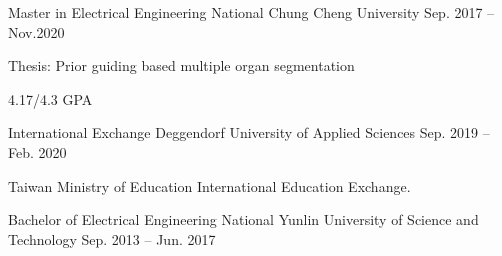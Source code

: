 

\begin{cventries}

\vspace{-0.5cm}
\cventryedu
{Master in Electrical Engineering} %
{National Chung Cheng University} %
{Sep. 2017 – Nov.2020} %
{
  \begin{cvitems}
    \item Thesis: Prior guiding based multiple organ segmentation
    \item 4.17/4.3 GPA
  \end{cvitems}
}

\cventryedu
{International Exchange}
{Deggendorf University of Applied Sciences} %
{Sep. 2019 – Feb. 2020} %
{
  \begin{cvitems}
    \item Taiwan Ministry of Education International Education Exchange.
  \end{cvitems}
}

\cventryedu
{Bachelor of Electrical Engineering} %
{National Yunlin University of Science and Technology} %
{Sep. 2013 – Jun. 2017} %
{}

\end{cventries}
